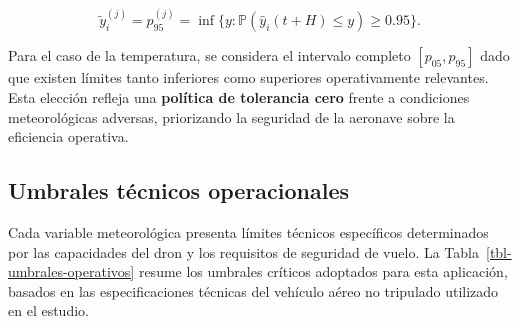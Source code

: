 \documentclass[
  spanish,
  us-letterpaper,
]{scrreprt}
\numberwithin{equation}{section}
\begin{document}
\[
\tilde{y}_i^{(j)} = p_{95}^{(j)} = \inf\{y : \mathbb{P}(\hat{y}_i(t+H) \leq y) \geq 0.95\}.
\]

Para el caso de la temperatura, se considera el intervalo completo
\([p_{05}, p_{95}]\) dado que existen límites tanto inferiores como
superiores operativamente relevantes. Esta elección refleja una
\textbf{política de tolerancia cero} frente a condiciones meteorológicas
adversas, priorizando la seguridad de la aeronave sobre la eficiencia
operativa.

\subsection{Umbrales técnicos
operacionales}\label{umbrales-tuxe9cnicos-operacionales}

Cada variable meteorológica presenta límites técnicos específicos
determinados por las capacidades del dron y los requisitos de seguridad
de vuelo. La Tabla~\ref{tbl-umbrales-operativos} resume los umbrales
críticos adoptados para esta aplicación, basados en las especificaciones
técnicas del vehículo aéreo no tripulado utilizado en el estudio.
\end{document}
